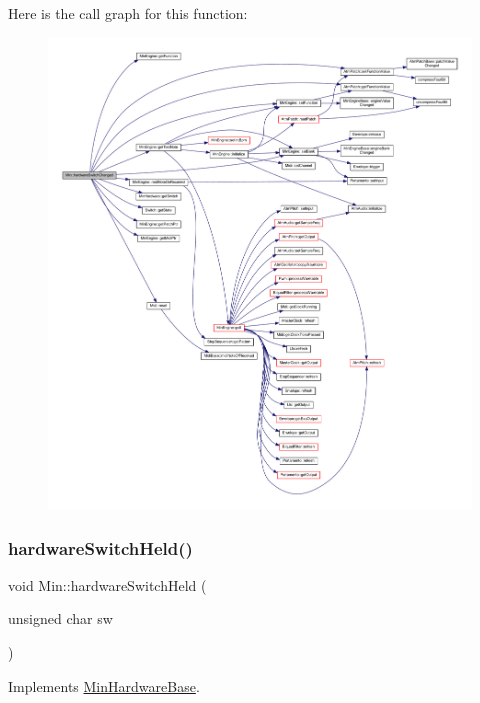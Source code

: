 Here is the call graph for this function\+:
\nopagebreak
\begin{figure}[H]
\begin{center}
\leavevmode
\includegraphics[width=350pt]{class_min_ae00f275ac6aeb73f932e62ae85abe5b1_cgraph}
\end{center}
\end{figure}
\mbox{\label{class_min_aa17c2510883d894f135d6a0582cc8bea}} 
\subsubsection{\texorpdfstring{hardware\+Switch\+Held()}{hardwareSwitchHeld()}}
{\footnotesize\ttfamily void Min\+::hardware\+Switch\+Held (\begin{DoxyParamCaption}\item[{unsigned char}]{sw }\end{DoxyParamCaption})\hspace{0.3cm}{\ttfamily [virtual]}}



Implements \hyperlink{class_min_hardware_base_a9e05f7b18377441b61457ded9a57f088}{Min\+Hardware\+Base}.



